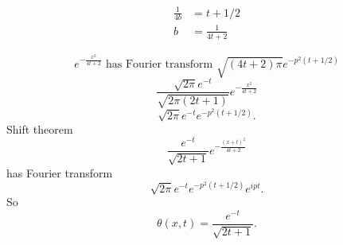 \documentclass[10pt, a4paper]{article}
\begin{document}
\begin{problem}[$2020$]
\begin{solution}
\begin{enumerate}[label = (\alph*)]
            \begin{align*}
                \frac{1}{4b} &= t + 1 / 2 \\
                b &= \frac{1}{4t + 2}
            \end{align*}

            \[
            e ^ {-\frac{x ^ 2}{4t + 2}}\text{ has Fourier transform } \sqrt{(4t + 2)\pi}e ^ {-p ^ 2(t + 1 / 2)}
            \]
            \[
            \frac{\sqrt{2\pi}e ^ {-t}}{\sqrt{2\pi(2t + 1)}}e ^ {-\frac{x ^ 2}{4t + 2}}
            \]
            \[
            \sqrt{2\pi}e ^ {-t}e ^ {-p ^ 2(t + 1 / 2)}.
            \]
            Shift theorem
            \[
            \frac{e ^ {-t}}{\sqrt{2t + 1}}e ^ {-\frac{(x + t) ^ 2}{4t + 2}}
            \]
            has Fourier transform
            \[
            \sqrt{2\pi}e ^ {-t}e ^ {-p ^ 2(t + 1 / 2)}e ^ {ipt}.
            \]
            So
            \[
            \theta(x, t) = \frac{e ^ {-t}}{\sqrt{2t + 1}}.
            \]
            
        \end{enumerate}
    \end{solution}
\end{problem}
\end{document}
